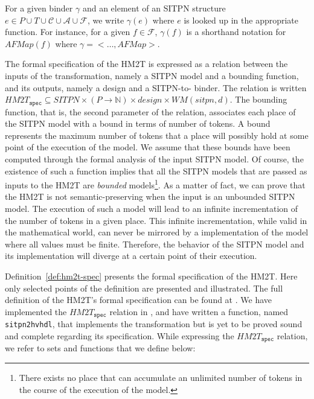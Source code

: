 For a given binder $\gamma$ and an element of an SITPN structure
$e\in{}P\cup{}T\cup\mathcal{C}\cup\mathcal{A}\cup\mathcal{F}$, we
write $\gamma(e)$ where $e$ is looked up in the appropriate
function. For instance, for a given $f\in\mathcal{F}$, $\gamma(f)$ is
a shorthand notation for $AFMap(f)$ where $\gamma={<}\dots,AFMap{>}$.

\bigskip

The formal specification of the HM2T is expressed as a relation
between the inputs of the transformation, namely a SITPN model and a
bounding function, and its outputs, namely a \hvhdl{} design and a
SITPN-to-\hvhdl{} binder. The relation is written
$HM2T_{\mathtt{spec}}\subseteq{}SITPN\times(P\rightarrow\mathbb{N})\times{}design\times{}WM(sitpn,d)$.
The bounding function, that is, the second parameter of the relation,
associates each place of the SITPN model with a bound in terms of
number of tokens.  A bound represents the maximum number of tokens
that a place will possibly hold at some point of the execution of the
model. We assume that these bounds have been computed through the
formal analysis of the input SITPN model. Of course, the existence of
such a function implies that all the SITPN models that are passed as
inputs to the HM2T are \textit{bounded} models\footnote{There exists
  no place that can accumulate an unlimited number of tokens in the
  course of the execution of the model.}. As a matter of fact, we can
prove that the HM2T is not semantic-preserving when the input is an
unbounded SITPN model. The execution of such a model will lead to an
infinite incrementation of the number of tokens in a given place. This
infinite incrementation, while valid in the mathematical world, can
never be mirrored by a \vhdl{} implementation of the model where all
values must be finite. Therefore, the behavior of the SITPN model and
its \hvhdl{} implementation will diverge at a certain point of their
execution.

\bigskip

Definition~\ref{def:hm2t-spec} presents the formal specification of
the HM2T. Here only selected points of the definition are presented
and illustrated. The full definition of the HM2T's formal
specification can be found at . We have implemented the
$HM2T_{\mathtt{spec}}$ relation in \coq{}, and have written a \coq{}
function, named \texttt{sitpn2hvhdl}, that implements the
transformation but is yet to be proved sound and complete regarding
its specification. %
While expressing the $HM2T_{\mathtt{spec}}$ relation, we refer to sets
and functions that we define below:

